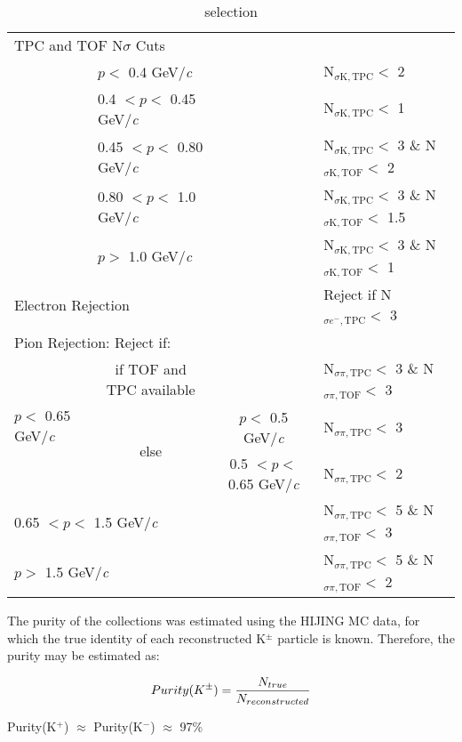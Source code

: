 \documentclass[../AnalysisNoteJBuxton.tex]{subfiles}
\begin{document}
\begin{table}[htbp]
\begin{tabular}{lc|c|l}
   \multicolumn{4}{l}{TPC and TOF N$\sigma$ Cuts} \\
   \cline{2-4}
    & \multicolumn{1}{l}{$p <$ 0.4 GeV/\textit{c}} &  & N$_{\sigma \mathrm{K,TPC}} <$ 2 \\
   \cline{2-4}
    & \multicolumn{1}{l}{0.4 $< p <$ 0.45 GeV/\textit{c}} & & N$_{\sigma \mathrm{K,TPC}} <$ 1 \\
   \cline{2-4}     
    & \multicolumn{1}{l}{0.45 $< p <$ 0.80 GeV/\textit{c}} & & N$_{\sigma \mathrm{K,TPC}} <$ 3 \& N$_{\sigma \mathrm{K,TOF}} <$ 2 \\ 
   \cline{2-4}
    & \multicolumn{1}{l}{0.80 $< p <$ 1.0 GeV/\textit{c}} & & N$_{\sigma \mathrm{K,TPC}} <$ 3 \& N$_{\sigma \mathrm{K,TOF}} <$ 1.5 \\ 
   \cline{2-4}
    & \multicolumn{1}{l}{$p >$ 1.0 GeV/\textit{c}} & & N$_{\sigma \mathrm{K,TPC}} <$ 3 \& N$_{\sigma \mathrm{K,TOF}} <$ 1 \\ 
   \hline
   \multicolumn{3}{l|}{Electron Rejection} & Reject if N$_{\sigma e^{-},\mathrm{TPC}} < $ 3 \\
   \hline
   
   \multicolumn{4}{l}{Pion Rejection:  Reject if:} \\
   \hline
   \multirow{3}{*}{$p <$ 0.65 GeV/\textit{c}} & if TOF and TPC available & \multicolumn{1}{c}{} & N$_{\sigma \pi,\mathrm{TPC}} <$ 3 \& N$_{\sigma \pi,\mathrm{TOF}} <$ 3 \\
   \cline{2-4}
    & \multirow{2}{*}{else} & $p <$ 0.5 GeV/\textit{c} & N$_{\sigma \pi,\mathrm{TPC}} <$ 3 \\
   \cline{3-4}
    &  & 0.5 $< p <$ 0.65 GeV/\textit{c} & N$_{\sigma \pi,\mathrm{TPC}} <$ 2 \\
   \cline{2-4}
   \multicolumn{3}{l|}{0.65 $< p <$ 1.5 GeV/\textit{c}} & N$_{\sigma \pi,\mathrm{TPC}} <$ 5 \& N$_{\sigma \pi,\mathrm{TOF}} <$ 3 \\
   \cline{2-4}
   \multicolumn{3}{l|}{$p >$ 1.5 GeV/\textit{c}} & N$_{\sigma \pi,\mathrm{TPC}} <$ 5 \& N$_{\sigma \pi,\mathrm{TOF}} <$ 2 \\
   \hline
  \end{tabular}
 \caption{\Kpm selection}
 \label{tab:KchCuts} 
\end{table}

 
 

The purity of the \Kpm collections was estimated using the HIJING MC data, for which the true identity of each reconstructed K$^{\pm}$ particle is known.  Therefore, the purity may be estimated as:

\begin{equation}
 Purity(K^{\pm}) = \frac{N_{true}}{N_{reconstructed}} \\
\label{eqn:KchPurity}
\end{equation}

Purity(K$^{+}$) $\approx$ Purity(K$^{-}$) $\approx$ 97\%
\end{document}
